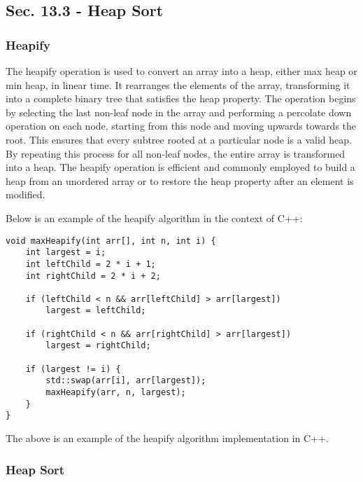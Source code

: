 \subsection*{Sec. 13.3 - Heap Sort}

\subsubsection{Heapify}

The heapify operation is used to convert an array into a heap, either max heap or min heap, in linear time. It rearranges the elements of the array, transforming it into a complete binary tree that satisfies the 
heap property. The operation begins by selecting the last non-leaf node in the array and performing a percolate down operation on each node, starting from this node and moving upwards towards the root. This ensures 
that every subtree rooted at a particular node is a valid heap. By repeating this process for all non-leaf nodes, the entire array is transformed into a heap. The heapify operation is efficient and commonly employed 
to build a heap from an unordered array or to restore the heap property after an element is modified.

\begin{solution}

Below is an example of the heapify algorithm in the context of C++:

\horizontalline

\begin{verbatim}
void maxHeapify(int arr[], int n, int i) {
    int largest = i;
    int leftChild = 2 * i + 1;
    int rightChild = 2 * i + 2;

    if (leftChild < n && arr[leftChild] > arr[largest])
        largest = leftChild;

    if (rightChild < n && arr[rightChild] > arr[largest])
        largest = rightChild;

    if (largest != i) {
        std::swap(arr[i], arr[largest]);
        maxHeapify(arr, n, largest);
    }
}
\end{verbatim}

\horizontalline

The above is an example of the heapify algorithm implementation in C++.

\end{solution}

\subsubsection{Heap Sort}

